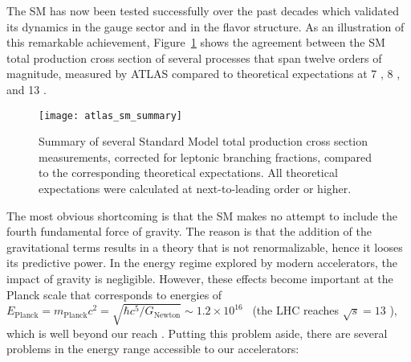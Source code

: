 The SM has now been tested successfully over the past decades which validated its dynamics in the gauge sector and in the flavor structure.
As an illustration of this remarkable achievement, Figure~\ref{fig:theory.sm.summary} shows the agreement between the SM total production cross section
of several processes that span twelve orders of magnitude, 
measured by ATLAS compared to theoretical expectations 
at 7 \TeV, 8 \TeV, and 13 \TeV.
\begin{figure}[htb!]
\centering
\texttt{[image: atlas\_sm\_summary]}
\caption{Summary of several Standard Model total production cross section measurements, corrected for leptonic branching fractions, 
compared to the corresponding theoretical expectations. All theoretical expectations were calculated at next-to-leading order or higher.}
\label{fig:theory.sm.summary}
\end{figure} 
The most obvious shortcoming is that the SM makes no attempt to include the fourth fundamental force of gravity. 
The reason is that the addition of the gravitational terms results in a theory that is not renormalizable, hence 
it looses its predictive power.
In the energy regime explored by modern accelerators, the impact of gravity is negligible. 
However, these effects become important at the Planck scale that corresponds to energies of 
$E_\text{Planck} = m_\text{Planck} c^2 = \sqrt{\hbar c^5/G_\text{Newton}} \sim 1.2 \times 10^{16}$ \TeV~(the LHC reaches $\sqrt{s}=13$ \TeV), 
which is well beyond our reach \cite{Ade:2013zuv}. 
Putting this problem aside, there are several problems in the energy range accessible to our accelerators:
